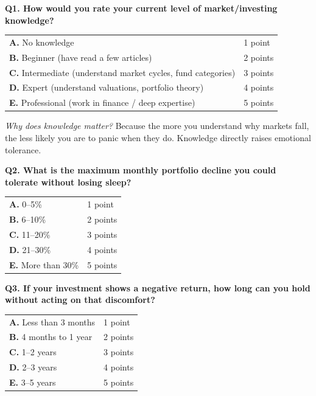 \documentclass[12pt,a4paper]{article}
\begin{document}
\begin{tcolorbox}[base, colback=ToleranceColor!7, colframe=ToleranceColor, breakable]
\textbf{\color{ToleranceColor}Q1. How would you rate your current level of market/investing knowledge?}

\medskip
\begin{tabular}{ll}
\textbf{A.} No knowledge & 1 point\\
\textbf{B.} Beginner (have read a few articles) & 2 points\\
\textbf{C.} Intermediate (understand market cycles, fund categories) & 3 points\\
\textbf{D.} Expert (understand valuations, portfolio theory) & 4 points\\
\textbf{E.} Professional (work in finance / deep expertise) & 5 points\\
\end{tabular}

\bigskip
\textit{Why does knowledge matter?} Because the more you understand why markets fall, the less likely you are to panic when they do. Knowledge directly raises emotional tolerance.

\bigskip
\textbf{\color{ToleranceColor}Q2. What is the maximum monthly portfolio decline you could tolerate without losing sleep?}

\medskip
\begin{tabular}{ll}
\textbf{A.} 0--5\% & 1 point\\
\textbf{B.} 6--10\% & 2 points\\
\textbf{C.} 11--20\% & 3 points\\
\textbf{D.} 21--30\% & 4 points\\
\textbf{E.} More than 30\% & 5 points\\
\end{tabular}

\bigskip
\textbf{\color{ToleranceColor}Q3. If your investment shows a negative return, how long can you hold without acting on that discomfort?}

\medskip
\begin{tabular}{ll}
\textbf{A.} Less than 3 months & 1 point\\
\textbf{B.} 4 months to 1 year & 2 points\\
\textbf{C.} 1--2 years & 3 points\\
\textbf{D.} 2--3 years & 4 points\\
\textbf{E.} 3--5 years & 5 points\\
\end{tabular}
\end{tcolorbox}
\end{document}
